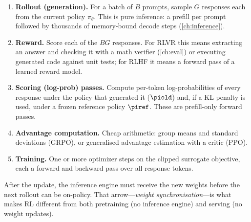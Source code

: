 \begin{enumerate}
\item \textbf{Rollout (generation).} For a batch of $B$ prompts, sample $G$ responses each
  from the current policy $\pi_{\theta}$. This is pure inference: a prefill per prompt
  followed by thousands of memory-bound decode steps (\cref{ch:inference}).
\item \textbf{Reward.} Score each of the $BG$ responses. For RLVR this means extracting an
  answer and checking it with a math verifier (\cref{ch:eval}) or executing generated code
  against unit tests; for RLHF it means a forward pass of a learned reward model.
\item \textbf{Scoring (log-prob) passes.} Compute per-token log-probabilities of every
  response under the policy that generated it ($\piold$) and, if a KL penalty is used,
  under a frozen reference policy $\piref$. These are prefill-only forward passes.
\item \textbf{Advantage computation.} Cheap arithmetic: group means and standard
  deviations (GRPO), or generalised advantage estimation with a critic (PPO).
\item \textbf{Training.} One or more optimizer steps on the clipped surrogate objective,
  each a forward and backward pass over all response tokens.
\end{enumerate}
After the update, the inference engine must receive the new weights before the next rollout
can be on-policy. That arrow---\emph{weight synchronisation}---is what makes RL different
from both pretraining (no inference engine) and serving (no weight updates).


